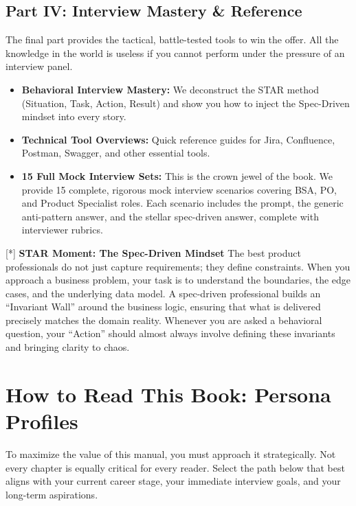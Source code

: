 \documentclass[
  11pt,
  openany,
  oneside]{book}
\providecommand{\tightlist}{%
  \setlength{\itemsep}{0pt}\setlength{\parskip}{0pt}}
\renewenvironment{quote}{\begin{customquote}}{\end{customquote}}
\begin{document}
\subsection{Part IV: Interview Mastery \&
Reference}\label{part-iv-interview-mastery-reference}

The final part provides the tactical, battle-tested tools to win the
offer. All the knowledge in the world is useless if you cannot perform
under the pressure of an interview panel.

\begin{itemize}
\tightlist
\item
  \textbf{Behavioral Interview Mastery:} We deconstruct the STAR method
  (Situation, Task, Action, Result) and show you how to inject the
  Spec-Driven mindset into every story.
\item
  \textbf{Technical Tool Overviews:} Quick reference guides for Jira,
  Confluence, Postman, Swagger, and other essential tools.
\item
  \textbf{15 Full Mock Interview Sets:} This is the crown jewel of the
  book. We provide 15 complete, rigorous mock interview scenarios
  covering BSA, PO, and Product Specialist roles. Each scenario includes
  the prompt, the generic anti-pattern answer, and the stellar
  spec-driven answer, complete with interviewer rubrics.
\end{itemize}

\begin{quote}
{[}*{]} \textbf{STAR Moment: The Spec-Driven Mindset} The best product
professionals do not just capture requirements; they define constraints.
When you approach a business problem, your task is to understand the
boundaries, the edge cases, and the underlying data model. A spec-driven
professional builds an ``Invariant Wall'' around the business logic,
ensuring that what is delivered precisely matches the domain reality.
Whenever you are asked a behavioral question, your ``Action'' should
almost always involve defining these invariants and bringing clarity to
chaos.
\end{quote}

\section{How to Read This Book: Persona
Profiles}\label{how-to-read-this-book-persona-profiles}

To maximize the value of this manual, you must approach it
strategically. Not every chapter is equally critical for every reader.
Select the path below that best aligns with your current career stage,
your immediate interview goals, and your long-term aspirations.
\end{document}
